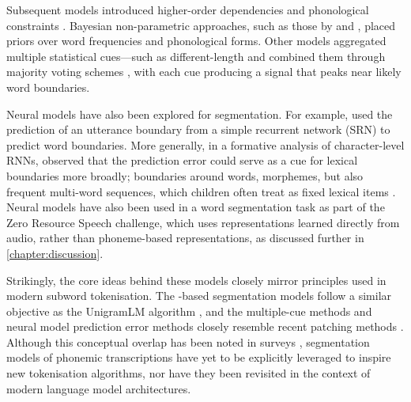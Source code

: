 
Subsequent models introduced higher-order \ngram dependencies \citep{Venkataraman2001} and phonological constraints \citep{Blanchard2010}. Bayesian non-parametric approaches, such as those by \citet{Goldwater2009} and \citet{algayres_dp-parse_2022}, placed priors over word frequencies and phonological forms. Other models aggregated multiple statistical cues—such as different-length \ngrams and combined them through majority voting schemes \citep{ccoltekin2014explicit, Coltekin2017, goriely2023word}, with each cue producing a signal that peaks near likely word boundaries.


Neural models have also been explored for segmentation. For example, \citet{christiansen1998learning} used the prediction of an utterance boundary from a simple recurrent network (SRN) to predict word boundaries. More generally, in a formative analysis of character-level RNNs, \citet{elman1990finding} observed that the prediction error could serve as a cue for lexical boundaries more broadly; boundaries around words, morphemes, but also frequent multi-word sequences, which children often treat as fixed lexical items \citep{macwhinney1978}. Neural models have also been used in a word segmentation task as part of the Zero Resource Speech challenge, which uses representations learned directly from audio, rather than phoneme-based representations, as discussed further in \cref{chapter:discussion}.

Strikingly, the core ideas behind these models closely mirror principles used in modern subword tokenisation. The \ngram-based segmentation models follow a similar objective as the UnigramLM algorithm \citep{kudo-2018-unigram}, and the multiple-cue methods and neural model prediction error methods closely resemble recent patching methods \citep{pagnoni2024byte}. Although this conceptual overlap has been noted in surveys \citep{mielke2021between}, segmentation models of phonemic transcriptions have yet to be explicitly leveraged to inspire new tokenisation algorithms, nor have they been revisited in the context of modern language model architectures.

